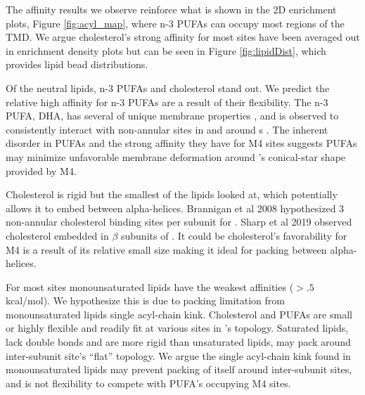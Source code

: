The affinity results we observe reinforce what is shown in the 2D enrichment plots, Figure \ref{fig:acyl_map}, where n-3 PUFAs can occupy most regions of the TMD. We argue cholesterol's strong affinity for most sites have been averaged out in enrichment density plots but can be seen in Figure \ref{fig:lipidDist}, which provides lipid bead distributions.

Of the neutral lipids, n-3 PUFAs and cholesterol stand out. We predict the relative high affinity for n-3 PUFAs are a result of their flexibility. The n-3 PUFA, DHA, has several of unique membrane properties \cite{Stillwell2003a,Gawrisch2003}, and is observed to consistently interact with non-annular sites in and around \plgic s \cite{Sharp2019, Woods2019}. The inherent disorder in PUFAs and the strong affinity they have for M4 sites suggests PUFAs may minimize unfavorable membrane deformation\cite{Brannigan2005a,Brannigan2007,Hu2012a,Argudo2016,BuganzaTepole2017,Dan1993,Fournier2015} around \plgic's conical-star shape provided by M4. 

Cholesterol is rigid but the smallest of the lipids looked at, which potentially allows it to embed between alpha-helices. Brannigan et al 2008 \cite{Brannigan2008} hypothesized 3 non-annular cholesterol binding sites per subunit for \nachr. Sharp et al 2019 \cite{Sharp2019} observed cholesterol embedded in $\beta$ subunits of \nachr. It could be cholesterol's favorability for M4 is a result of its relative small size making it ideal for packing between alpha-helices.

For most sites monounsaturated lipids have the weakest affinities ($>.5$ kcal/mol). We hypothesize this is due to packing limitation from monounsaturated lipids single acyl-chain kink. Cholesterol and PUFAs are small or highly flexible and readily fit at various sites in \plgic's topology. Saturated lipids, lack double bonds and are more rigid than unsaturated lipids, may pack around inter-subunit site's ``flat'' topology. We argue the single acyl-chain kink found in monounsaturated lipids may prevent packing of itself around inter-subunit sites, and is not flexibility to compete with PUFA's occupying M4 sites. 

